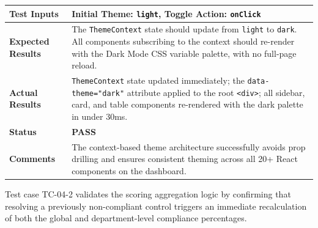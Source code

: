 \begin{table}[H]
{\begin{tabular}{|>{\raggedright\arraybackslash\bfseries}p{4.5cm}|>{\raggedright\arraybackslash}p{11.5cm}|}
        Test Inputs & Initial Theme: \texttt{light}, Toggle Action: \texttt{onClick} \\ \hline
        Expected Results & The \texttt{ThemeContext} state should update from \texttt{light} to \texttt{dark}. All components subscribing to the context should re-render with the Dark Mode CSS variable palette, with no full-page reload. \\ \hline
        Actual Results & \texttt{ThemeContext} state updated immediately; the \texttt{data-theme="dark"} attribute applied to the root \texttt{<div>}; all sidebar, card, and table components re-rendered with the dark palette in under 30ms. \\ \hline
        Status & \textcolor{green!60!black}{\textbf{PASS}} \\ \hline
        Comments & The context-based theme architecture successfully avoids prop drilling and ensures consistent theming across all 20+ React components on the dashboard. \\ \hline
    \end{tabular}
    }
\end{table}

Test case TC-04-2 validates the scoring aggregation logic by confirming that resolving a previously non-compliant control triggers an immediate recalculation of both the global and department-level compliance percentages.

